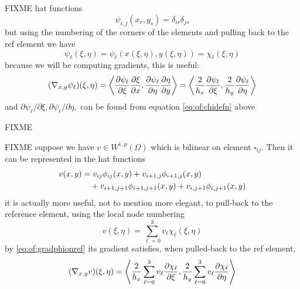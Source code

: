 FIXME hat functions
\begin{equation}
  \psi_{i,j}(x_r,y_s) = \delta_{ir} \delta_{js}  \label{eq:of:phinodewise}
\end{equation}
but using the numbering of the corners of the elements and pulling back to the ref element we have
\begin{equation}
  \psi_\ell(\xi,\eta) = \psi_\ell(x(\xi,\eta),y(\xi,\eta)) = \chi_\ell(\xi,\eta)  \label{eq:of:phionref}
\end{equation}
because we will be computing gradients, this is useful:
\begin{equation}
  (\nabla_{x,y} \psi_\ell)(\xi,\eta) = \left<\frac{\partial\psi_\ell}{\partial \xi} \frac{\partial\xi}{\partial x},\frac{\partial\psi_\ell}{\partial \eta} \frac{\partial\eta}{\partial y}\right> = \left<\frac{2}{h_x}\frac{\partial\psi_\ell}{\partial \xi},\frac{2}{h_y}\frac{\partial\psi_\ell}{\partial \eta}\right>   \label{eq:of:gradphionref}
\end{equation}
and $\partial\psi_\ell/\partial \xi,\partial\psi_\ell/\partial \eta,$ can be found from equation \eqref{eq:of:chidefn} above

\begin{marginfigure}

\caption{FIXME}
\label{fig:q1hat}
\end{marginfigure}

FIXME suppose we have $v \in W^{1,p}(\Omega)$ which is bilinear on element $\square_{ij}$.  Then it can be represented in the hat functions
\begin{align}
v(x,y) &= v_{ij} \phi_{ij}(x,y) + v_{i+1,j} \phi_{i+1,j}(x,y) \label{eq:of:bilinearrepresentation} \\
 &\quad + v_{i+1,j+1} \phi_{i+1,j+1}(x,y) + v_{i,j+1} \phi_{i,j+1}(x,y) \notag \end{align}
it is actually more useful, not to mention more elegant, to pull-back to the reference element, using the local node numbering
\begin{equation}
v(\xi,\eta) = \sum_{\ell=0}^3 v_\ell \chi_\ell(\xi,\eta)  \label{eq:of:bilinearrepresentationref}
\end{equation}
by \eqref{eq:of:gradphionref} its gradient satisfies, when pulled-back to the ref element,
\begin{equation}
  (\nabla_{x,y} v)(\xi,\eta) = \left<\frac{2}{h_x} \sum_{\ell=0}^3 v_\ell \frac{\partial\chi_\ell}{\partial \xi}, \frac{2}{h_y} \sum_{\ell=0}^3 v_\ell \frac{\partial\chi_\ell}{\partial \eta}\right> \label{eq:of:gradrepref}
\end{equation}


